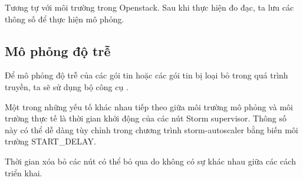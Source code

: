 Tương tự với môi trường trong Openstack. Sau khi thực hiện đo đạc, ta lưu các thông số để thực hiện mô phỏng.

\subsection{Mô phỏng độ trễ}

Để mô phỏng độ trễ của các gói tin hoặc các gói tin bị loại bỏ trong quá trình truyền, ta sẽ sử dụng bộ công cụ \autocite{iproute2}.

Một trong những yếu tố khác nhau tiếp theo giữa môi trường mô phỏng và môi trường thực tế là thời gian khởi động của các nút Storm supervisor. Thông số này có thể dễ dàng tùy chỉnh trong chương trình storm-autoscaler bằng biến môi trường START\_DELAY.

Thời gian xóa bỏ các nút có thể bỏ qua do không có sự khác nhau giữa các cách triển khai.